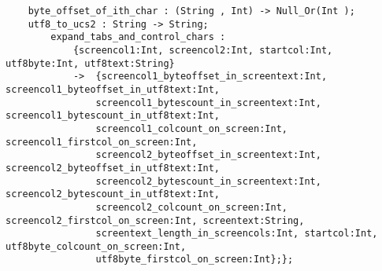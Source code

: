 \begin{verbatim}
    byte_offset_of_ith_char : (String , Int) -> Null_Or(Int );
    utf8_to_ucs2 : String -> String;
        expand_tabs_and_control_chars :
            {screencol1:Int, screencol2:Int, startcol:Int, utf8byte:Int, utf8text:String}
            ->  {screencol1_byteoffset_in_screentext:Int, screencol1_byteoffset_in_utf8text:Int,
                screencol1_bytescount_in_screentext:Int, screencol1_bytescount_in_utf8text:Int,
                screencol1_colcount_on_screen:Int, screencol1_firstcol_on_screen:Int,
                screencol2_byteoffset_in_screentext:Int, screencol2_byteoffset_in_utf8text:Int,
                screencol2_bytescount_in_screentext:Int, screencol2_bytescount_in_utf8text:Int,
                screencol2_colcount_on_screen:Int, screencol2_firstcol_on_screen:Int, screentext:String,
                screentext_length_in_screencols:Int, startcol:Int, utf8byte_colcount_on_screen:Int,
                utf8byte_firstcol_on_screen:Int};};
\end{verbatim}
\index[fun]{>=}
\index[fun]{>}
\index[fun]{<=}
\index[fun]{<}
\index[fun]{+}
